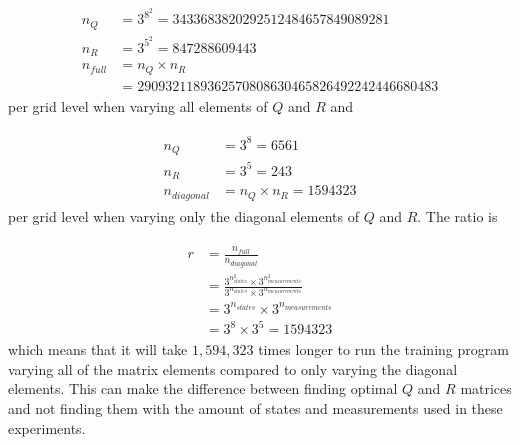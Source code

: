 \begin{align*}
\begin{split}
n_Q &= 3^{8^2} = 3433683820292512484657849089281 \\
n_R &= 3^{5^2} = 847288609443 \\
n_{full} &= n_Q \times n_R \\
&= 2909321189362570808630465826492242446680483
\end{split}
\end{align*}
per grid level when varying all elements of $Q$ and $R$ and

\begin{align*}
\begin{split}
n_Q &= 3^8 = 6561 \\
n_R &= 3^5 = 243 \\
n_{diagonal} &= n_Q \times n_R = 1594323
\end{split}
\end{align*}
per grid level when varying only the diagonal elements of $Q$ and $R$. The ratio is

\begin{align*}
\begin{split}
r &= \frac{n_{full}}{n_{diagonal}} \\
&= \frac{3^{n_{states}^2} \times 3^{n_{measurements}^2}}{3^{n_{states}} \times 3^{n_{measurements}}} \\
&= 3^{n_{states}} \times 3^{n_{measurements}} \\
&= 3^8 \times 3^5 = 1594323
\end{split}
\end{align*}
which means that it will take $1,594,323$ times longer to run the training program varying all of the matrix elements compared to only varying the diagonal elements. This can make the difference between finding optimal $Q$ and $R$ matrices and not finding them with the amount of states and measurements used in these experiments.

